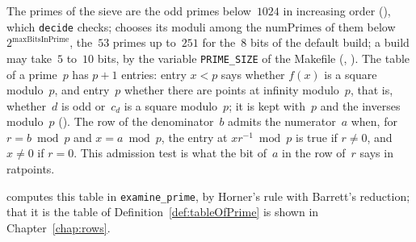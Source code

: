 \begin{definition}\label{def:tableOfPrime}
  \leanok
  The primes of the sieve are the odd primes below~$1024$ in increasing order
  (), which \verb|decide| checks; \ratpoints{} chooses its moduli among the
  $\mathrm{numPrimes}$ of them below $2^{\mathrm{maxBitsInPrime}}$, the~$53$ primes up to~$251$ for
  the~$8$ bits of the default build; a build may take~$5$ to~$10$ bits, by the variable
  \verb|PRIME_SIZE| of the Makefile (,
  ).
  The table of a prime~$p$ has $p + 1$ entries: entry $x < p$ says whether $f(x)$ is a square
  modulo~$p$, and entry~$p$ whether there are points at infinity modulo~$p$, that is, whether~$d$
  is odd or~$c_d$ is a square modulo~$p$; it is kept with~$p$ and the inverses modulo~$p$
  (). The row of the denominator~$b$ admits the numerator~$a$ when,
  for $r = b \bmod p$ and $x = a \bmod p$, the entry at $x r^{-1} \bmod p$ is true if $r \ne 0$,
  and $x \ne 0$ if $r = 0$. This admission test is what the bit of~$a$ in the row of~$r$ says in
  ratpoints.
\end{definition}

\ratpoints{} computes this table in \verb|examine_prime|, by Horner's rule with Barrett's reduction;
that it is the table of Definition~\ref{def:tableOfPrime} is shown in Chapter~\ref{chap:rows}.

